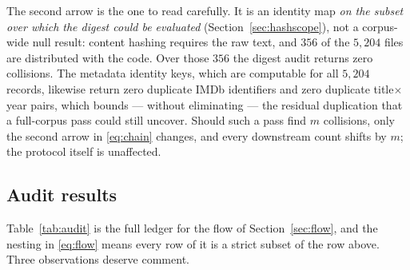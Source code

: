 \documentclass[conference,a4paper]{IEEEtran}
\begin{document}
The second arrow is the one to read carefully. It is an identity map
\emph{on the subset over which the digest could be evaluated}
(Section~\ref{sec:hashscope}), not a corpus-wide null result: content
hashing requires the raw text, and $356$ of the $5{,}204$ files are
distributed with the code. Over those $356$ the digest audit returns zero
collisions. The metadata identity keys, which are computable for all
$5{,}204$ records, likewise return zero duplicate IMDb identifiers and
zero duplicate title$\times$year pairs, which bounds --- without
eliminating --- the residual duplication that a full-corpus pass could
still uncover. Should such a pass find $m$ collisions, only the second
arrow in \eqref{eq:chain} changes, and every downstream count shifts by
$m$; the protocol itself is unaffected.

\subsection{Audit results}

Table~\ref{tab:audit} is the full ledger for the flow of
Section~\ref{sec:flow}, and the nesting in \eqref{eq:flow} means every
row of it is a strict subset of the row above. Three observations deserve
comment.
\end{document}

